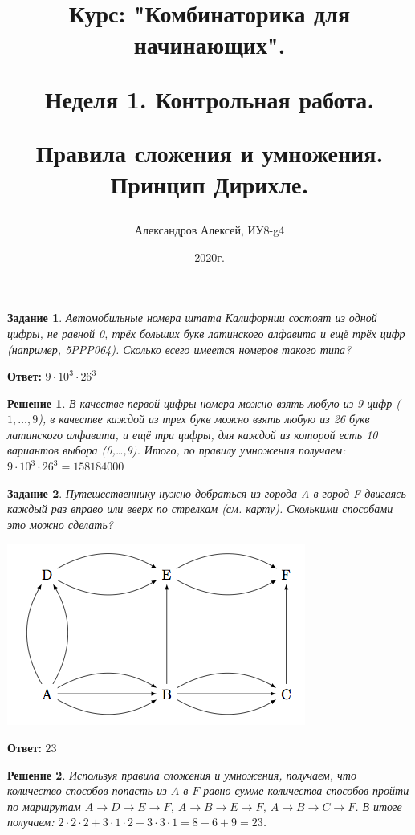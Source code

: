 \documentclass[a4paper,oneside]{memoir}
\title{Курс: "Комбинаторика для начинающих".
	
Неделя 1. Контрольная работа.
	 
Правила сложения и умножения. Принцип Дирихле.}
\author{Александров Алексей, ИУ8-g4}
\date{2020г.}
\newtheorem{task}{Задание}
\newtheorem{solution}{Решение}
\begin{document}
	
\maketitle

\begin{task}
	Автомобильные номера штата Калифорнии состоят из одной цифры, не равной 0, трёх больших букв латинского алфавита и ещё трёх цифр (например, 5PPP064). Сколько всего имеется номеров такого типа?
\end{task}

\textbf{Ответ:} $ 9 \cdot 10^{3} \cdot 26^{3} $

\begin{solution}
В качестве первой цифры номера можно взять любую из 9 цифр ($ {1,…,9} $), в качестве каждой из трех букв можно взять любую из 26 букв латинского алфавита, и ещё три цифры, для каждой из которой есть 10 вариантов выбора ({0,…,9}). Итого, по правилу умножения получаем: $ 9 \cdot 10^3 \cdot 26^3 = 158184000 $
\end{solution}

\hrulefill

\begin{task}
Путешественнику нужно добраться из города A в город F двигаясь каждый раз вправо или вверх по стрелкам (см. карту). Сколькими способами это можно сделать?

\includegraphics[scale=0.5]{roads}

\end{task}

\textbf{Ответ:} $ 23 $

\begin{solution}
	Используя правила сложения и умножения, получаем, что количество способов попасть из $A$ в $F$ равно сумме количества способов пройти по маршрутам $A \rightarrow D \rightarrow E \rightarrow F$, $A \rightarrow B \rightarrow E \rightarrow F$, $A \rightarrow B \rightarrow C \rightarrow F$. В итоге получаем: $2\cdot2\cdot2 + 3\cdot1\cdot2 + 3\cdot3\cdot1 = 8 + 6 + 9 = 23 $.
\end{solution}
\end{document}
